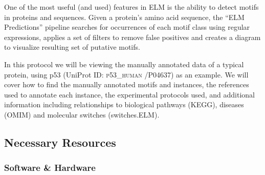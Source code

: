\documentclass[12pt]{article}
\newcounter{proto}
\newcommand\uniprot[1]{%
	\textsc{\lowercase{#1}}%
}
\begin{document}
One of the most useful (and used) features in ELM is the ability to
detect motifs in proteins and sequences. Given a protein's amino acid
sequence, the ``ELM Predictions'' pipeline searches for occurrences of
each motif class using regular expressions, applies a set of filters to
remove false positives and creates a diagram to visualize resulting
set of putative motifs.

In this protocol we will be viewing the manually annotated data of a
typical protein, using p53 (UniProt ID: \uniprot{P53\_HUMAN}/P04637) as an
example. We will cover how to find the manually annotated motifs and instances,
the references used to annotate each
instance, the experimental protocols used, and additional information including
relationships to biological pathways (KEGG), diseases (OMIM) and molecular
switches (switches.ELM).

%
%
\subsection*{Necessary Resources}
\subsubsection*{Software \& Hardware}

\end{document}
